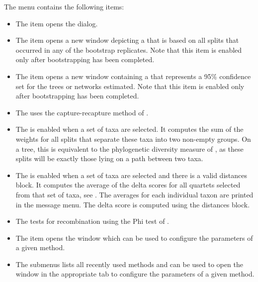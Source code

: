 \documentclass[11pt]{article}
\begin{document}
The  menu contains the following items:
\begin{itemize}
\item The  item opens the
 dialog.
\item The  item
opens a new  window depicting a 
that is based on all splits that occurred in any of the bootstrap
replicates. Note that this item is enabled only after bootstrapping
has been completed.
\item The  item
opens a new  window containing a 
that represents a 95\% confidence set for the trees or networks
estimated. Note that this item is enabled only after bootstrapping
has been completed.
\item The   uses the capture-recapture
method of \cite{Lockhart2000a}.
\item The  is enabled when a set of taxa
are selected. It computes the sum of the weights for all splits that separate these taxa into two
non-empty groups. On a tree, this is equivalent to the phylogenetic diversity measure of \cite{Faith92}, as these
splits will be exactly those lying on a path between two taxa.
\item The  is enabled when a set of taxa are selected and there is
a valid distances block. It
computes the average of the delta scores for all quartets selected from that set of taxa, see \cite{Holland2002Delta}. The averages
for each individual taxon are printed in the message menu. The delta score is computed using the
distances block.
\item The  tests for recombination using the
Phi test of \cite{Bruen05}.
\item The  item
opens the  window which can be used to configure
the parameters of a given method.
\item The  submenus
lists all recently used methods and can be used to open
the  window in the appropriate tab to configure
the parameters of a given method.
\end{itemize}

\end{document}

